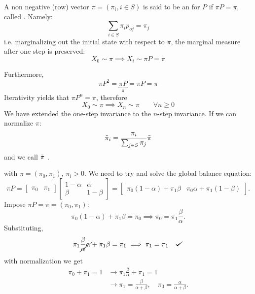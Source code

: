 \documentclass{article}
\begin{document}
\begin{definition}
    A non negative (row) vector $\pi=(\pi_i, i\in S)$ is said to be an  for $P$ if $\pi P=\pi$, called . Namely:
    \[\sum_{i \in S} \pi_i p_{oj}=\pi_j \]
    i.e. marginalizing out the initial state with respect to $\pi$, the marginal measure after one step is preserved:
    \[
    X_0 \sim \pi \implies X_i \sim \pi P = \pi
    \]
\end{definition}
Furthermore,
\[
\pi P^2=\underbrace{\pi P}_{\pi}=\pi P= \pi
\]
Iterativity yields that $\pi P^n=\pi$, therefore
\[
X_0\sim \pi \implies X_n\sim\pi \qquad \forall n \geqslant 0
\]
We have extended the one-step invariance to the $n$-step invariance. If we can normalize $\pi$:
\[
\Tilde{\pi}_i=\frac{\pi_i}{\sum_{j\in S}\pi_j}\Tilde{\pi}\]
and we call $\Tilde{\pi}$ .
\begin{example}
        \begin{figure}[H]
            \centering
        \end{figure}
 with $\pi=(\pi_0,\pi_1)$, $\pi_i>0$.
    We need to try and solve the global balance equation:
    \[
    \pi P=\begin{bmatrix}
        \pi_0 & \pi_1
        \end{bmatrix}\begin{bmatrix}
            1-\alpha & \alpha \\
            \beta & 1-\beta
        \end{bmatrix}=\begin{bmatrix}
            \pi_0(1-\alpha)+\pi_1\beta & \pi_0\alpha+\pi_1(1-\beta)
        \end{bmatrix}.
    \]
    Impose $\pi P=\pi=(\pi_0, \pi_1)$:
    \[
    \pi_0(1-\alpha)+\pi_1\beta=\pi_0 \implies \pi_0=\pi_1\frac{\beta}{\alpha}.
    \]
    Substituting,
    \[
    \pi_1\frac{\beta}{\cancel{\alpha}}\cancel{\alpha}+\pi_1\beta=\pi_1 \implies \pi_1=\pi_1 \quad\tikz\fill[scale=0.4](0,.35) -- (.25,0) -- (1,.7) -- (.25,.15) -- cycle;
    \]
    with normalization we get
    \begin{align*}
        \pi_0+\pi_1=1&\longrightarrow{}\pi_1\frac{\beta}{\alpha}+\pi_1=1\\
        &\longrightarrow\pi_1=\frac{\beta}{\alpha+\beta},\quad\pi_0=\frac{\alpha}{\alpha+\beta}.
    \end{align*}
\end{example}
\end{document}
